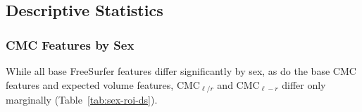 \documentclass{article}
\newcommand{\CMC}{\(\text{CMC}\) }
\begin{document}


%



\subsection{Descriptive Statistics}





\subsubsection{CMC Features by Sex}

While all base FreeSurfer features differ significantly by sex, as do the
base \CMC features and expected volume features, \(\text{CMC}_{\ell/r}\) and
\(\text{CMC}_{\ell - r}\) differ only marginally (Table~\ref{tab:sex-roi-ds}).
\end{document}

